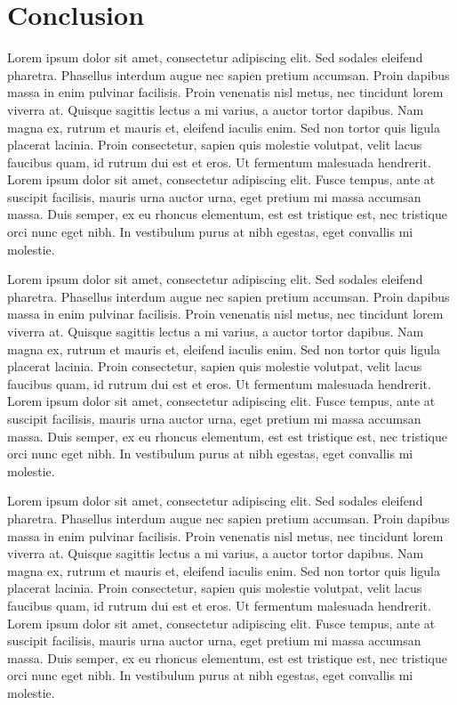 
\section{Conclusion}
Lorem ipsum dolor sit amet, consectetur adipiscing elit. Sed sodales
eleifend pharetra. Phasellus interdum augue nec sapien pretium accumsan.
Proin dapibus massa in enim pulvinar facilisis. Proin venenatis nisl metus,
nec tincidunt lorem viverra at. Quisque sagittis lectus a mi varius, a
auctor tortor dapibus. Nam magna ex, rutrum et mauris et, eleifend iaculis
enim. Sed non tortor quis ligula placerat lacinia. Proin consectetur, sapien
quis molestie volutpat, velit lacus faucibus quam, id rutrum dui est et
eros. Ut fermentum malesuada hendrerit. Lorem ipsum dolor sit amet,
consectetur adipiscing elit. Fusce tempus, ante at suscipit facilisis,
mauris urna auctor urna, eget pretium mi massa accumsan massa. Duis semper,
ex eu rhoncus elementum, est est tristique est, nec tristique orci nunc eget
nibh. In vestibulum purus at nibh egestas, eget convallis mi molestie.

Lorem ipsum dolor sit amet, consectetur adipiscing elit. Sed sodales
eleifend pharetra. Phasellus interdum augue nec sapien pretium accumsan.
Proin dapibus massa in enim pulvinar facilisis. Proin venenatis nisl metus,
nec tincidunt lorem viverra at. Quisque sagittis lectus a mi varius, a
auctor tortor dapibus. Nam magna ex, rutrum et mauris et, eleifend iaculis
enim. Sed non tortor quis ligula placerat lacinia. Proin consectetur, sapien
quis molestie volutpat, velit lacus faucibus quam, id rutrum dui est et
eros. Ut fermentum malesuada hendrerit. Lorem ipsum dolor sit amet,
consectetur adipiscing elit. Fusce tempus, ante at suscipit facilisis,
mauris urna auctor urna, eget pretium mi massa accumsan massa. Duis semper,
ex eu rhoncus elementum, est est tristique est, nec tristique orci nunc eget
nibh. In vestibulum purus at nibh egestas, eget convallis mi molestie.

Lorem ipsum dolor sit amet, consectetur adipiscing elit. Sed sodales
eleifend pharetra. Phasellus interdum augue nec sapien pretium accumsan.
Proin dapibus massa in enim pulvinar facilisis. Proin venenatis nisl metus,
nec tincidunt lorem viverra at. Quisque sagittis lectus a mi varius, a
auctor tortor dapibus. Nam magna ex, rutrum et mauris et, eleifend iaculis
enim. Sed non tortor quis ligula placerat lacinia. Proin consectetur, sapien
quis molestie volutpat, velit lacus faucibus quam, id rutrum dui est et
eros. Ut fermentum malesuada hendrerit. Lorem ipsum dolor sit amet,
consectetur adipiscing elit. Fusce tempus, ante at suscipit facilisis,
mauris urna auctor urna, eget pretium mi massa accumsan massa. Duis semper,
ex eu rhoncus elementum, est est tristique est, nec tristique orci nunc eget
nibh. In vestibulum purus at nibh egestas, eget convallis mi molestie.







